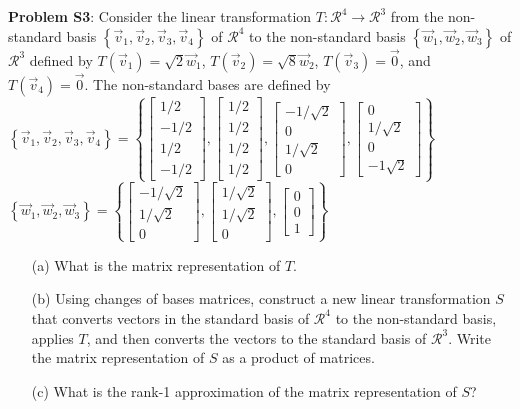 \documentclass[12pt,pdftex]{article}
\begin{document}
\noindent \textbf{Problem S3}: Consider the linear transformation $T: 
\mathcal{R}^4\rightarrow\mathcal{R}^3$ from the non-standard basis  $\left\{\vec{v}_1, \vec{v}_2, \vec{v}_3, \vec{v}_4\right\}$ of $\mathcal{R}^4$ to the 
non-standard basis $\left\{\vec{w}_1, \vec{w}_2, \vec{w}_3\right\}$ of 
$\mathcal{R}^3$ defined by $T(\vec{v}_1) = \sqrt{2}\vec{w}_1$, $T(\vec{v}_2) 
= \sqrt{8}\vec{w}_2$, $T(\vec{v}_3) = \vec{0}$, and $T(\vec{v}_4) = \vec{0}$.  
The non-standard bases are defined by \\
$\left\{\vec{v}_1, \vec{v}_2, \vec{v}_3, \vec{v}_4\right\}=\left\{ 
\left[\begin{array}{c}1/2\\ -1/2\\ 1/2\\ -1/2 
\end{array}\right],\left[\begin{array}{c}1/2\\ 1/2\\ 1/2\\ 1/2 
\end{array}\right],\left[\begin{array}{c} -1/\sqrt{2}\\ 
0 \\1/\sqrt{2}\\0\end{array}\right],\left[\begin{array}{c} 0\\1/\sqrt{2} \\ 0\\ 
-1\sqrt{2}\end{array}\right]  \right\}$ \\
$\left\{\vec{w}_1, \vec{w}_2, \vec{w}_3\right\}=\left\{ \left[\begin{array}{c}-
1/\sqrt{2}\\ 1/\sqrt{2}\\ 0\end{array}\right],\left[\begin{array}{c}1/\sqrt{2}\\
1/\sqrt{2}\\ 0 \end{array}\right],\left[\begin{array}{c} 0\\ 0\\ 
1\end{array}\right] \right\} $ 
\begin{itemize}
\item[(a)] What is the matrix representation of $T$.
\item[(b)] Using changes of bases matrices, construct a new linear 
transformation $S$ that converts vectors in the standard basis of 
$\mathcal{R}^4$ to the non-standard basis, applies $T$, and then converts the 
vectors to the standard basis of $\mathcal{R}^3$. Write the matrix 
representation of $S$ as a product of matrices. 
\item[(c)] What is the rank-1 approximation of the matrix representation of $S$?
\end{itemize}
\end{document}
